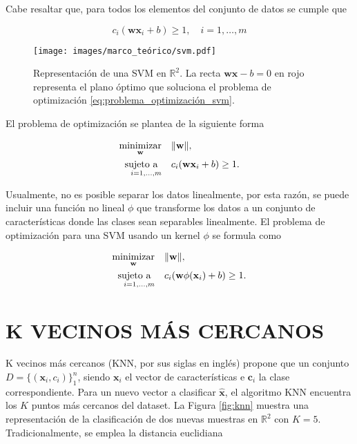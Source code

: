 Cabe resaltar que, para todos los elementos del conjunto de datos se cumple que

\begin{equation}
    c_i(\mathbf{w}\mathbf{x}_i + b) \geq 1, \quad i=1,\dots, m
\end{equation}

\begin{figure}[H]
    \centering
    \caption{\hspace{2mm}Representación de una SVM en $\mathbb{R}^2$. La recta $\mathbf{wx} -b = 0$ en rojo representa el plano óptimo que soluciona el problema de optimización \eqref{eq:problema_optimización_svm}.}
    \texttt{[image: images/marco\_teórico/svm.pdf]}
    \label{fig:svm}
\end{figure}

El problema de optimización se plantea de la siguiente forma

\begin{equation}
    \begin{aligned}
        \operatorname*{minimizar}_{\mathbf{w}} & \quad \Vert \mathbf{w} \Vert, \\
        \operatorname*{sujeto \ a}_{\quad i=1,\dots, m} & \quad c_i(\mathbf{w}\mathbf{x}_i + b) \geq 1.
    \end{aligned}
    \label{eq:problema_optimización_svm}
\end{equation}

Usualmente, no es posible separar los datos linealmente, por esta razón, se puede incluir una función no lineal $ \phi$ que transforme los datos a un conjunto de características donde las clases sean separables linealmente. El problema de optimización para una SVM usando un kernel $\phi$ se formula como

\begin{equation}
    \begin{aligned}
        \operatorname*{minimizar}_{\mathbf{w}} & \quad \Vert \mathbf{w} \Vert, \\
        \operatorname*{sujeto \ a}_{\quad i=1,\dots, m} & \quad c_i(\mathbf{w}\phi(\mathbf{x}_i) + b) \geq 1.
    \end{aligned}
\end{equation}


\section{K VECINOS MÁS CERCANOS}

K vecinos más cercanos (KNN, por sus siglas en inglés) propone que un conjunto $D = \{(\mathbf{x}_i, {c}_i)\}_1^n$, siendo $\mathbf{x}_i$ el vector de características e $\mathbf{c}_i$ la clase correspondiente. Para un nuevo vector a clasificar $\mathbf{\hat{x}}$, el algoritmo KNN encuentra los $K$ puntos más cercanos del dataset. La Figura \ref{fig:knn} muestra una representación de la clasificación de dos nuevas muestras en $\mathbb{R}^2$ con $K = 5$. Tradicionalmente, se emplea la distancia euclidiana 

